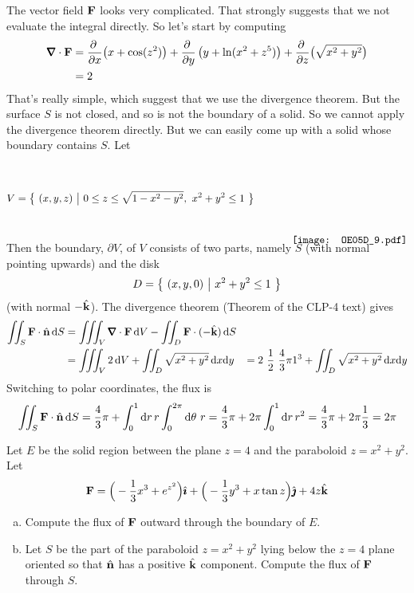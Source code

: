 \begin{solution}
The vector field $\mathbf{F}$ looks very complicated. 
That strongly suggests that we not evaluate the integral directly.
So let's start by computing
\begin{align*}
\vnabla\cdot\vF &= 
    \pdiff{}{x}\big(x + \cos(z^2)\big)
     +\pdiff{}{y}\left(y + \ln(x^2 + z^5)\right)
     +\pdiff{}{z}\big(\sqrt{x^2 + y^2}\big) \\
   &=   2
\end{align*}
That's really simple, which suggest that we use the divergence theorem.
But the surface $S$ is not closed, and so is not the boundary of a solid.
So we cannot apply the divergence theorem directly. But we can easily
come up with a solid whose boundary contains $S$. Let
\begin{equation*}
V=\Set{(x,y,z)}{0\le z\le \sqrt{1-x^2-y^2},\ x^2+y^2\le 1}
    \hskip0.5in\raisebox{-40pt}[40pt][30pt]
                         {\texttt{[image: OE05D\_9.pdf]}}
\end{equation*}
Then the boundary, $\partial V$, of $V$ consists of two parts, namely $S$
(with normal pointing upwards) and the disk
\begin{equation*}
D=\big\{ \ (x,y,0)\ \big|\ x^2+y^2\le 1\ \big\}
\end{equation*}
(with normal $-\hat{\mathbf{k}}$).  The divergence theorem 
(Theorem  of the CLP-4 text) gives
\begin{align*}
\dblInt_S \vF \cdot \hn\,\dee{S}
&=\tripInt_V \vnabla\cdot\vF\,\dee{V}
    -\dblInt_D \vF \cdot (-\hk)\,\dee{S} \\
&=\tripInt_V 2\,\dee{V}
  +\dblInt_D \sqrt{x^2+y^2}\,\dee{x}\dee{y} 
&=2\ \frac{1}{2}\ \frac{4}{3}\pi 1^3
  +\dblInt_D \sqrt{x^2+y^2}\,\dee{x}\dee{y} 
\end{align*}
Switching to polar coordinates, the flux is
\begin{align*}
\iint_S \mathbf{F}\cdot\hat{\mathbf{n}}\,\mathrm{d}S
=\frac{4}{3}\pi+\int_0^1\mathrm{d}r\,r\int_0^{2\pi}\mathrm{d}\theta\ r
=\frac{4}{3}\pi + 2\pi \int_0^1 \mathrm{d}r\, r^2
=\frac{4}{3}\pi + 2\pi \frac{1}{3}
=2\pi
\end{align*}

\end{solution}

\begin{question}[M317 2015A]  %
Let $E$ be the solid region between the plane $z = 4$ and the paraboloid 
$z = x^2 + y^2$. Let
\begin{equation*}
\mathbf{F} = \Big(-\frac{1}{3}x^3 + e^{z^2}\Big)\hat{\pmb{\imath}} 
     + \Big(-\frac{1}{3}y^3 + x\tan z\Big)\hat{\pmb{\jmath}} + 4z\hat{\mathbf{k}}
\end{equation*}
\begin{enumerate}[(a)]
\item
Compute the flux of $\mathbf{F}$ outward through the boundary of $E$.

\item
Let $S$ be the part of the paraboloid $z = x^2 + y^2$ lying below the 
$z = 4$ plane oriented so that $\hat{\mathbf{n}}$ has a positive $\hat{\mathbf{k}}$ component. 
Compute the flux of $\mathbf{F}$ through $S$.
\end{enumerate}

\end{question}


